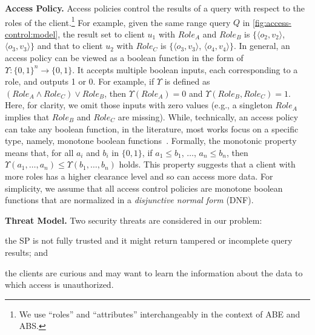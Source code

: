 \textbf{Access Policy.}
Access policies control the results of a query with respect to the roles of the client.\footnote{We use ``roles'' and ``attributes'' interchangeably in the context of ABE and ABS.}
For example, given the same range query $Q$ in \cref{fig:access-control:model}, the result set to client $u_1$ with $Role_A$ and $Role_B$ is $\{\langle o_2, v_2\rangle$, $\langle o_3, v_3\rangle\}$ and that to client $u_2$ with $Role_C$ is $\{\langle o_3, v_3\rangle$, $\langle o_4, v_4\rangle\}$. In general, an access policy can be viewed as a boolean function in the form of $\Upsilon : {\{0, 1\}}^n \to \{0, 1\}$. It accepts multiple boolean inputs, each corresponding to a role, and outputs 1 or 0. For example, if $\Upsilon$ is defined as $({Role}_A \land {Role}_C) \lor {Role}_B$, then $\Upsilon({Role}_A) = 0$ and $\Upsilon({Role}_B, {Role}_C) = 1$. Here, for clarity, we omit those inputs with zero values (e.g., a singleton $Role_A$ implies that $Role_B$ and $Role_C$ are missing). While, technically, an access policy can take any boolean function, in the literature, most works focus on a specific type, namely, monotone boolean functions~\cite{10.1145/1180405.1180418,10.1109/sp.2007.11,10.1007/978-3-642-19074-2_24,10.1145/1755688.1755697}. Formally, the monotonic property means that, for all $a_i$ and $b_i$ in $\{0, 1\}$, if $a_1 \le b_1$, $\dots$, $a_n \le b_n$, then $\Upsilon(a_1, \dots, a_n) \le \Upsilon(b_1, \dots, b_n)$ holds. This property suggests that a client with more roles has a higher clearance level and so can access more data. %
For simplicity, we assume that all access control policies are monotone boolean functions that are normalized in a \emph{disjunctive normal form} (DNF).

\textbf{Threat Model.}
Two security threats are considered in our problem:
\begin{inlineenum}
\item the SP is not fully trusted and it might return tampered or incomplete query results; and
\item the clients are curious and may want to learn the information about the data to which access is unauthorized.
\end{inlineenum}

